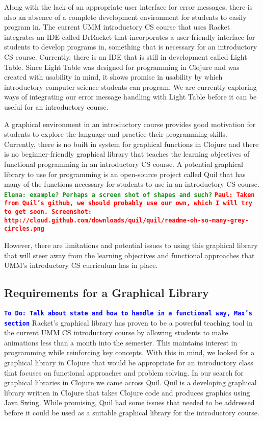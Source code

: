 \documentclass[12pt]{article}
\newcommand{\comment}[1]{{\bf \tt  {#1}}}
\newcommand{\emcomment}[1]{\textcolor{ForestGreen}{\comment{Elena: {#1}}}}
\newcommand{\todo}[1]{\textcolor{blue}{\comment{To Do: {#1}}}}
\newcommand{\pscomment}[1]{\textcolor{red}{\comment{Paul: {#1}}}}
\begin{document}
Along with the lack of an appropriate user interface for error messages, there is also an absence of a complete development environment for students to easily program in. The current UMM introductory CS course that uses Racket integrates an IDE called DrRacket that incorporates a user-friendly interface for students to develop programs in, something that is necessary for an introductory CS course.  Currently, there is an IDE that is still in development called Light Table.  Since Light Table was designed for programming in Clojure and was created with usability in mind, it shows promise in usability by which introductory computer science students can program. We are currently exploring ways of integrating our error message handling with Light Table before it can be useful for an introductory course. 

A graphical environment in an introductory course provides good motivation for students to explore the language and practice their programming skills. Currently, there is no built in system for graphical functions in Clojure and there is no beginner-friendly graphical library that teaches the learning objectives of functional programming in an introductory CS course. A potential graphical library to use for programming is an open-source project called Quil that has many of the functions necessary for students to use in an introductory CS course.
\emcomment{example? Perhaps a screen shot of shapes and such?}
\pscomment{Taken from Quil's github, we should probably use our own, which I will try to get soon.  Screenshot: http://cloud.github.com/downloads/quil/quil/readme-oh-so-many-grey-circles.png}

However, there are limitations and potential issues to using this graphical library that will steer away from the learning objectives and functional approaches that UMM’s introductory CS curriculum has in place.


\subsection{Requirements for a Graphical Library}\label{subsec:requirements}
\todo{Talk about state and how to handle in a functional way, Max's section}
Racket's graphical library has proven to be a powerful teaching tool in the current UMM CS introductory course by allowing students to make animations less than a month into the semester. This maintains interest in programming while reinforcing key concepts. With this in mind, we looked for a graphical library in Clojure that would be appropriate for an introductory class that focuses on functional approaches and problem solving. In our search for graphical libraries in Clojure we came across Quil. Quil is a developing graphical library written in Clojure that takes Clojure code and produces graphics using Java Swing. While promising, Quil had some issues that needed to be addressed before it could be used as a suitable graphical library for the introductory course.
\end{document}
